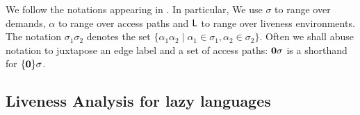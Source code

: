 \documentclass[9pt]{sigplanconf}
\begin{document}
We follow the notations appearing in \cite{asati14lgc}. In particular,
We use $\sigma$  to range over demands, $\alpha$ to  range over access
paths and  $\mathsf{L}$ to  range over  liveness environments.   The notation
$\sigma_1\sigma_2$  denotes  the  set $\lbrace  \alpha_1\alpha_2  \mid
\alpha_1 \in \sigma_1, \alpha_2  \in \sigma_2\rbrace$.  Often we shall
abuse notation to  juxtapose an edge label and a  set of access paths:
$\mathbf{0}\sigma$ is a shorthand for $\lbrace\mathbf{0}\rbrace\sigma$.

\subsection{Liveness Analysis for lazy languages}
\label{sec:liveness-analysis}

\end{document}
